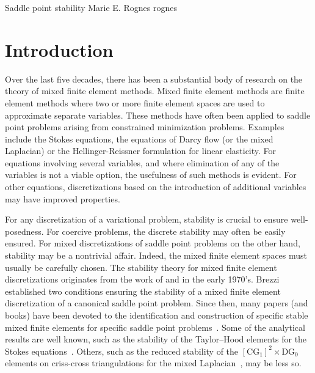               {Saddle point stability}
              {Marie E. Rognes}
              {rognes}

\newcommand{\rognesc}{c}
\newcommand{\rognestriang}{\mathcal{T}}

\newcommand{\rognesvectorcg}[2]{[\mathrm{CG}_{#1}]^{#2}}
\newcommand{\rognescg}[1]{\mathrm{CG}_{#1}}
\newcommand{\rognesrt}[1]{\mathrm{RT}_{#1}}
\newcommand{\rognesdg}[1]{\mathrm{DG}_{#1}}
\newcommand{\rognesascot}{ASCoT}
\newcommand{\rognespython}{python}

\section{Introduction}

Over the last five decades, there has been a substantial body of
research on the theory of mixed finite element methods.  Mixed finite
element methods are finite element methods where two or more finite
element spaces are used to approximate separate variables.  These
methods have often been applied to saddle point problems arising from
constrained minimization problems. Examples include the Stokes
equations, the equations of Darcy flow (or the mixed Laplacian) or the
Hellinger-Reissner formulation for linear elasticity.  For equations
involving several variables, and where elimination of any of the
variables is not a viable option, the usefulness of such methods is
evident. For other equations, discretizations based on the
introduction of additional variables may have improved properties.

For any discretization of a variational problem, stability is crucial
to ensure well-posedness. For coercive problems, the discrete
stability may often be easily ensured. For mixed discretizations of
saddle point problems on the other hand, stability may be a nontrivial
affair. Indeed, the mixed finite element spaces must usually be
carefully chosen. The stability theory for mixed finite element
discretizations originates from the work of \citet{Babuvska1972/73}
and \citet{Brezzi1974} in the early 1970's. Brezzi established two
conditions ensuring the stability of a mixed finite element
discretization of a canonical saddle point problem.  Since then, many
papers (and books) have been devoted to the identification and
construction of specific stable mixed finite elements for specific
saddle point problems~\citep{ArnoldFalkWinther2006,
BrezziDouglasMarini1985, BrezziFalk1991, BrezziFortin1991,
RaviartThomas1977, TaylorHood1973}. Some of the analytical results are
well known, such as the stability of the Taylor--Hood elements for the
Stokes equations~\citep{BrezziFalk1991, Stenberg1984, TaylorHood1973}.
Others, such as the reduced stability of the
$\rognesvectorcg{1}{2} \times
\rognesdg{0}$ elements on criss-cross triangulations for the mixed
Laplacian~\citep{BoffiBrezziGastaldi2000}, may be less so.

